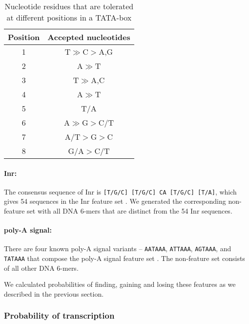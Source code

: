 \documentclass[12pt,a4paper]{article}
\begin{document}
\begin{table}[!t]
\centering
\begin{tabular}{c c}
\toprule
Position  & Accepted nucleotides \\ \midrule
1         & T$\gg$C$>$A,G        \\ \midrule
2         & A$\gg$T               \\ \midrule
3         & T$\gg$A,C             \\ \midrule
4         & A$\gg$T               \\ \midrule
5         & T/A                   \\ \midrule
6         & A$\gg$G$>$C/T         \\ \midrule
7         & A/T$>$G$>$C           \\ \midrule
8         & G/A$>$C/T             \\ \bottomrule
\end{tabular}
\caption{Nucleotide residues that are tolerated at different positions in a TATA-box \citep[based on][]{tata1}}
\label{tatatab}
\end{table}


\paragraph{Inr:} The consensus sequence of Inr is \texttt{[T/G/C] [T/G/C] CA [T/G/C] [T/A]}, which gives 54 sequences in the Inr feature set \citep{Inr}. We generated the corresponding non-feature set with all DNA 6-mers that are distinct from the 54 Inr sequences.

\paragraph{poly-A signal:} There are four known poly-A signal variants -- \texttt{AATAAA}, \texttt{ATTAAA}, \texttt{AGTAAA}, and \texttt{TATAAA} that compose the poly-A signal feature set \citep{polyA}. The non-feature set consists of all other DNA 6-mers.

\vspace{1\baselineskip}

We calculated probabilities of finding, gaining and losing these features as we described in the previous section.

\subsubsection{Probability of transcription}
\end{document}
